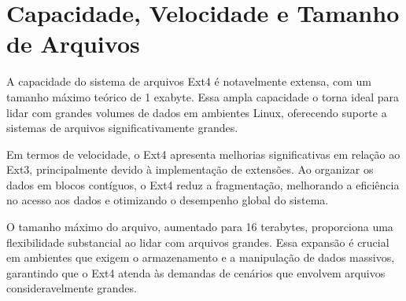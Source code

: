 \documentclass[
	12pt,				%
	openright,			%
	oneside,			%
	a4paper,			%
	chapter=TITLE,		%
	english,			%
	french,				%
	spanish,			%
	brazil				%
	]{abntex2}
\theoremstyle{definition}
\begin{document}






\section{Capacidade, Velocidade e Tamanho de Arquivos}
A capacidade do sistema de arquivos Ext4 é notavelmente extensa, com um tamanho máximo teórico de 1 exabyte. Essa 
ampla capacidade o torna ideal para lidar com grandes volumes de dados em ambientes Linux, oferecendo suporte a 
sistemas de arquivos significativamente grandes.

Em termos de velocidade, o Ext4 apresenta melhorias significativas em relação ao Ext3, principalmente devido 
à implementação de extensões. Ao organizar os dados em blocos contíguos, o Ext4 reduz a fragmentação, melhorando 
a eficiência no acesso aos dados e otimizando o desempenho global do sistema.

O tamanho máximo do arquivo, aumentado para 16 terabytes, proporciona uma flexibilidade substancial ao lidar 
com arquivos grandes. Essa expansão é crucial em ambientes que exigem o armazenamento e a manipulação de dados 
massivos, garantindo que o Ext4 atenda às demandas de cenários que envolvem arquivos consideravelmente grandes.
\end{document}
